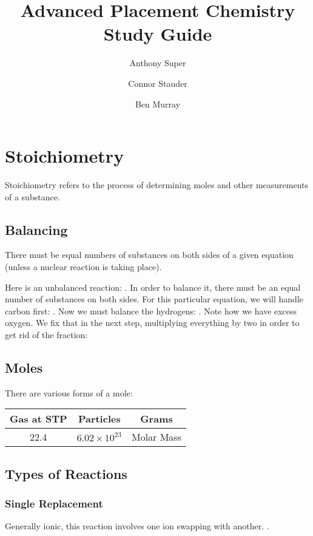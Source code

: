 \documentclass[]{article}
\begin{document}
\title{Advanced Placement Chemistry Study Guide}
\author{Anthony Super \and Connor Stauder \and Ben Murray}
\maketitle
\tableofcontents
\section{Stoichiometry}
Stoichiometry refers to the process of determining moles and other measurements of a substance.

\subsection{Balancing}

There must be equal numbers of substances on both sides of a given equation (unless a nuclear reaction is taking place). 

Here is an unbalanced reaction:
.
In order to balance it, there must be an equal number of substances on both sides. For this particular equation, we will handle carbon first:
. Now we must balance the hydrogens: . Note how we have excess oxygen. We fix that in the next step, multiplying everything by two in order to get rid of the fraction: 

\subsection{Moles}

There are various forms of a mole:

\begin{tabular}{| c | c | c|}
\hline
Gas at STP & Particles & Grams \\
\hline
22.4 & $ 6.02 \times 10^{23} $ & Molar Mass \\ 
\hline
\end{tabular}

\subsection{Types of Reactions}
\subsubsection{Single Replacement}
Generally ionic, this reaction involves one ion swapping with another. . 
\end{document}
